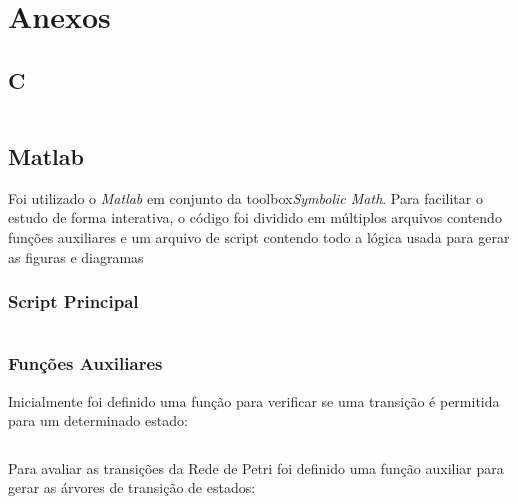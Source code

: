 \documentclass[a4paper,11pt]{article}
\begin{document}
\newpage
\section*{Anexos}



\subsection*{C}
\inputminted[xleftmargin=15pt,linenos,frame=single,framesep=5pt,breaklines=true]{c}{../c/project.c}

\newpage
\subsection*{Matlab}

Foi utilizado o \textit{Matlab} em conjunto da toolbox\textit{Symbolic Math}\cite{matlabsymbolic}. Para facilitar o estudo de forma interativa, o código foi dividido em múltiplos arquivos contendo funções auxiliares e um arquivo de script contendo todo a lógica usada para gerar as figuras e diagramas

\subsubsection*{Script Principal}

\inputminted[xleftmargin=15pt,linenos,frame=single,framesep=5pt,breaklines=true]{matlab}{../matlab/petrinetproject.m}

\subsubsection*{Funções Auxiliares}

Inicialmente foi definido uma função para verificar se uma transição é permitida para um determinado estado:

\inputminted[xleftmargin=15pt,linenos,frame=single,framesep=5pt,breaklines=true]{matlab}{../matlab/petristate.m}

Para avaliar as transições da Rede de Petri foi definido uma função auxiliar para gerar as árvores de transição de estados:

\inputminted[xleftmargin=15pt,linenos,frame=single,framesep=5pt,breaklines=true]{matlab}{../matlab/dotpetree.m}

\end{document}
